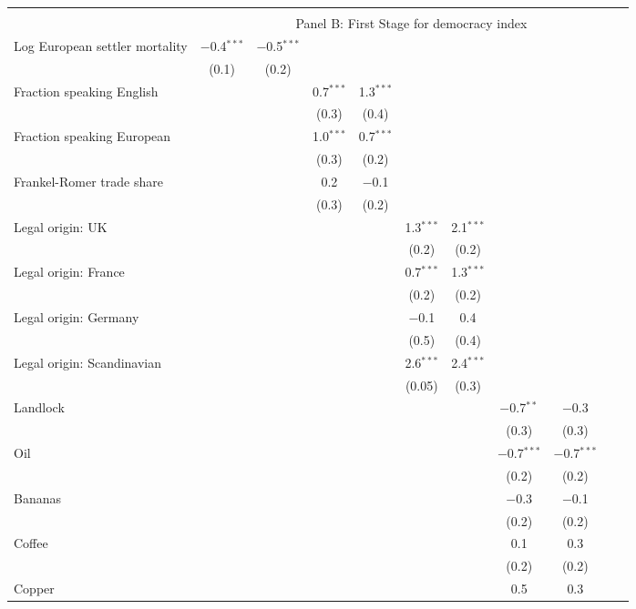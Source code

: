{\begin{table}[]
\begin{threeparttable}
\begin{tabular}{@{\extracolsep{0pt}}lcccccccccc}
\hline \\[-1.8ex] 
   & \multicolumn{10}{c}{Panel B: First Stage for democracy index} \\
 Log European settler mortality & $-$0.4$^{***}$ & $-$0.5$^{***}$ &  &  &  &  &  &  &  &  \\ 
  & (0.1) & (0.2) &  &  &  &  &  &  &  &  \\ 
  Fraction speaking English &  &  & 0.7$^{***}$ & 1.3$^{***}$ &  &  &  &  &  &  \\ 
  &  &  & (0.3) & (0.4) &  &  &  &  &  &  \\ 
  Fraction speaking European &  &  & 1.0$^{***}$ & 0.7$^{***}$ &  &  &  &  &  &  \\ 
  &  &  & (0.3) & (0.2) &  &  &  &  &  &  \\ 
  Frankel-Romer trade share &  &  & 0.2 & $-$0.1 &  &  &  &  &  &  \\ 
  &  &  & (0.3) & (0.2) &  &  &  &  &  &  \\ 
  Legal origin: UK &  &  &  &  & 1.3$^{***}$ & 2.1$^{***}$ &  &  &  &  \\ 
  &  &  &  &  & (0.2) & (0.2) &  &  &  &  \\ 
  Legal origin: France &  &  &  &  & 0.7$^{***}$ & 1.3$^{***}$ &  &  &  &  \\ 
  &  &  &  &  & (0.2) & (0.2) &  &  &  &  \\ 
  Legal origin: Germany &  &  &  &  & $-$0.1 & 0.4 &  &  &  &  \\ 
  &  &  &  &  & (0.5) & (0.4) &  &  &  &  \\ 
  Legal origin: Scandinavian &  &  &  &  & 2.6$^{***}$ & 2.4$^{***}$ &  &  &  &  \\ 
  &  &  &  &  & (0.05) & (0.3) &  &  &  &  \\ 
  Landlock &  &  &  &  &  &  & $-$0.7$^{**}$ & $-$0.3 &  &  \\ 
  &  &  &  &  &  &  & (0.3) & (0.3) &  &  \\ 
  Oil &  &  &  &  &  &  & $-$0.7$^{***}$ & $-$0.7$^{***}$ &  &  \\ 
  &  &  &  &  &  &  & (0.2) & (0.2) &  &  \\ 
  Bananas &  &  &  &  &  &  & $-$0.3 & $-$0.1 &  &  \\ 
  &  &  &  &  &  &  & (0.2) & (0.2) &  &  \\ 
  Coffee &  &  &  &  &  &  & 0.1 & 0.3 &  &  \\ 
  &  &  &  &  &  &  & (0.2) & (0.2) &  &  \\ 
  Copper &  &  &  &  &  &  & 0.5 & 0.3 &  &  \\ 

\end{tabular}
\end{threeparttable}
\end{table}}
